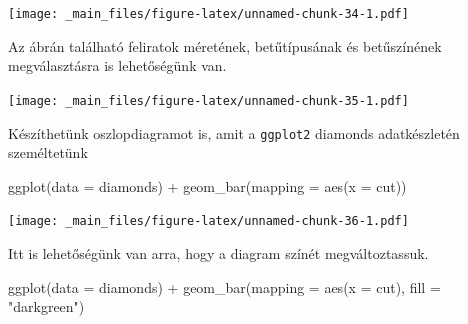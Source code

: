 \documentclass[
]{book}
\newenvironment{Shaded}{\begin{snugshade}}{\end{snugshade}}
\newcommand{\AttributeTok}[1]{\textcolor[rgb]{0.77,0.63,0.00}{#1}}
\newcommand{\DecValTok}[1]{\textcolor[rgb]{0.00,0.00,0.81}{#1}}
\newcommand{\FunctionTok}[1]{\textcolor[rgb]{0.00,0.00,0.00}{#1}}
\newcommand{\NormalTok}[1]{#1}
\newcommand{\SpecialCharTok}[1]{\textcolor[rgb]{0.00,0.00,0.00}{#1}}
\newcommand{\StringTok}[1]{\textcolor[rgb]{0.31,0.60,0.02}{#1}}
\begin{document}
\texttt{[image: \_main\_files/figure-latex/unnamed-chunk-34-1.pdf]}

Az ábrán található feliratok méretének, betűtípusának és betűszínének
megválasztásra is lehetőségünk van.

\begin{Shaded}
\end{Shaded}

\texttt{[image: \_main\_files/figure-latex/unnamed-chunk-35-1.pdf]}

Készíthetünk oszlopdiagramot is, amit a \texttt{ggplot2} diamonds
adatkészletén személtetünk

\begin{Shaded}
\begin{Highlighting}[]
\FunctionTok{ggplot}\NormalTok{(}\AttributeTok{data =}\NormalTok{ diamonds) }\SpecialCharTok{+}
  \FunctionTok{geom\_bar}\NormalTok{(}\AttributeTok{mapping =} \FunctionTok{aes}\NormalTok{(}\AttributeTok{x =}\NormalTok{ cut))}
\end{Highlighting}
\end{Shaded}

\texttt{[image: \_main\_files/figure-latex/unnamed-chunk-36-1.pdf]}

Itt is lehetőségünk van arra, hogy a diagram színét megváltoztassuk.

\begin{Shaded}
\begin{Highlighting}[]
\FunctionTok{ggplot}\NormalTok{(}\AttributeTok{data =}\NormalTok{ diamonds) }\SpecialCharTok{+}
  \FunctionTok{geom\_bar}\NormalTok{(}\AttributeTok{mapping =} \FunctionTok{aes}\NormalTok{(}\AttributeTok{x =}\NormalTok{ cut), }\AttributeTok{fill =} \StringTok{"darkgreen"}\NormalTok{)}
\end{Highlighting}
\end{Shaded}
\end{document}
